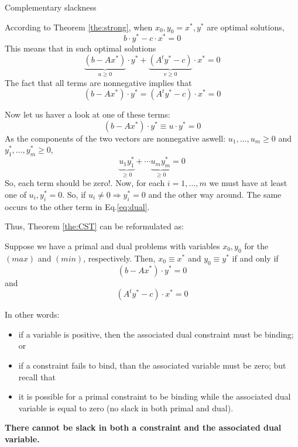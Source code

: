 \documentclass[c]{beamer}
\begin{document}
\begin{frame}[allowframebreaks]{Complementary slackness}
  \framebreak

  According to Theorem \ref{the:strong}, when $x_0,y_0=x^*,y^*$ are optimal solutions, \[b\cdot y^* - c\cdot x^* =0\]
  This means that in such optimal solutions
  \[\underbrace{(b-Ax^*)}_{u\geq 0}\cdot y^*+\underbrace{(A^ty^*-c)}_{v\geq 0}\cdot x^*=0\]
  The fact that all terms are nonnegative implies that 
  \begin{equation}(b-Ax^*)\cdot y^*=(A^ty^*-c)\cdot x^*=0\label{eq:dual}\end{equation}
  \framebreak

  Now let us haver a look at one of these terms:
  \[(b-Ax^*)\cdot y^*\equiv u\cdot y^*=0\]
  As the components of the two vectors are nonnegative aswell: $u_1,\ldots,u_m\geq0$ and $y^*_1,\ldots,y^*_m\geq0$, 
  \[\underbrace{u_1 y_1^*}_{\geq0}+\cdots \underbrace{u_m y_m^*}_{\geq0}=0\]
  So, each term should be zero!. Now, for each $i=1,\ldots,m$ we must have at least one of $u_i,y_i^*=0$. So, if $u_i\neq 0 \Rightarrow y_i^*=0$ and the other way around. The same occurs to the other term in Eq.\ref{eq:dual}.
  
  \framebreak 

  Thus, Theorem \ref{the:CST} can be reformulated as:
  \begin{theorem}
    Suppose we have a primal and dual problems with variables $x_0,y_0$ for the $(max)$ and $(min)$, respectively. Then, $x_0\equiv x^*$ and $y_0\equiv y^*$ if and only if 
    \begin{equation}(b-Ax^*)\cdot y^*=0\label{eq:CST1}\end{equation}
    and 
    \begin{equation}(A^ty^*-c)\cdot x^*=0\label{eq:CST2}\end{equation}
    \label{the:CST2}
  \end{theorem}

  \framebreak 


  In other words: 
  \begin{itemize}
    \item if a variable is positive, then the associated dual constraint must be binding; or
    \item if a constraint fails to bind, than the associated variable must be zero; but recall that
    \item it is possible for a primal constraint to be binding while the associated dual variable is equal to zero (no slack in both primal and dual).
  \end{itemize}
  {\bf There cannot be slack in both a constraint and the associated dual variable.}
 
 
  
\end{frame}
\end{document}
